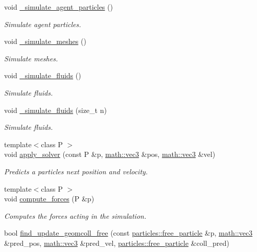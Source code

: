 \begin{DoxyCompactItemize}
void \hyperlink{classphysim_1_1simulator_a97eef0600da8870ee590babaffff775b}{\+\_\+simulate\+\_\+agent\+\_\+particles} ()
\begin{DoxyCompactList}\small\item\em Simulate agent particles. \end{DoxyCompactList}\item 
void \hyperlink{classphysim_1_1simulator_ac598aa9b36e01c8cee937a8f95719cd8}{\+\_\+simulate\+\_\+meshes} ()
\begin{DoxyCompactList}\small\item\em Simulate meshes. \end{DoxyCompactList}\item 
void \hyperlink{classphysim_1_1simulator_ac01677745377a9520453b73e199fcf99}{\+\_\+simulate\+\_\+fluids} ()
\begin{DoxyCompactList}\small\item\em Simulate fluids. \end{DoxyCompactList}\item 
void \hyperlink{classphysim_1_1simulator_a5b0b7e9c7790144f17d5de13c8d098dc}{\+\_\+simulate\+\_\+fluids} (size\+\_\+t n)
\begin{DoxyCompactList}\small\item\em Simulate fluids. \end{DoxyCompactList}\item 
{\footnotesize template$<$class P $>$ }\\void \hyperlink{classphysim_1_1simulator_a551890b383f97f13bb429e40f72c6c33}{apply\+\_\+solver} (const P \&p, \hyperlink{structphysim_1_1math_1_1vec3}{math\+::vec3} \&pos, \hyperlink{structphysim_1_1math_1_1vec3}{math\+::vec3} \&vel)
\begin{DoxyCompactList}\small\item\em Predicts a particle\textquotesingle{}s next position and velocity. \end{DoxyCompactList}\item 
{\footnotesize template$<$class P $>$ }\\void \hyperlink{classphysim_1_1simulator_a00c7815358139bf08b2e13fe1ab377bc}{compute\+\_\+forces} (P \&p)
\begin{DoxyCompactList}\small\item\em Computes the forces acting in the simulation. \end{DoxyCompactList}\item 
bool \hyperlink{classphysim_1_1simulator_a223170686fbf961c62d52da3fdc964c8}{find\+\_\+update\+\_\+geomcoll\+\_\+free} (const \hyperlink{classphysim_1_1particles_1_1free__particle}{particles\+::free\+\_\+particle} \&p, \hyperlink{structphysim_1_1math_1_1vec3}{math\+::vec3} \&pred\+\_\+pos, \hyperlink{structphysim_1_1math_1_1vec3}{math\+::vec3} \&pred\+\_\+vel, \hyperlink{classphysim_1_1particles_1_1free__particle}{particles\+::free\+\_\+particle} \&coll\+\_\+pred)

\end{DoxyCompactItemize}
